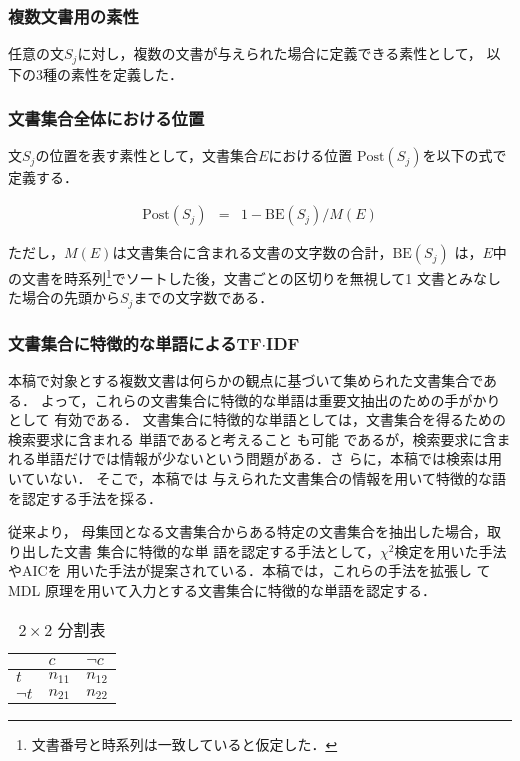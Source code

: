 \subsubsection{複数文書用の素性}

任意の文$S_j$に対し，複数の文書が与えられた場合に定義できる素性として，
以下の3種の素性を定義した．

\subsubsection*{文書集合全体における位置}

文$S_j$の位置を表す素性として，文書集合$E$における位置
$\mbox{Post}(S_j)$を以下の式で定義する．

\begin{eqnarray}
 \mbox{Post}(S_j) &=& 1 - \mbox{BE}(S_j)/M(E) \nonumber
\end{eqnarray}

ただし，$M(E)$は文書集合に含まれる文書の文字数の合計，$\mbox{BE}(S_j)$
は，$E$中の文書を時系列\footnote{
文書番号と時系列は一致していると仮定した．
}でソートした後，文書ごとの区切りを無視して1
文書とみなした場合の先頭から$S_j$までの文字数である．


\subsubsection*{文書集合に特徴的な単語によるTF$\cdot$IDF}

本稿で対象とする複数文書は何らかの観点に基づいて集められた文書集合である．
よって，これらの文書集合に特徴的な単語は重要文抽出のための手がかりとして
有効である．
文書集合に特徴的な単語としては，文書集合を得るための検索要求に含まれる
単語であると考えること
も可能
であるが，検索要求に含まれる単語だけでは情報が少ないという問題がある．さ
らに，本稿では検索は用いていない．
そこで，本稿では
与えられた文書集合の情報を用いて特徴的な語を認定する手法を採る．

従来より，
母集団となる文書集合からある特定の文書集合を抽出した場合，取り出した文書
集合に特徴的な単
語を認定する手法として，$\chi^2$検定を用いた手法\cite{article43,article45}やAICを
用いた手法\cite{article44}が提案されている．本稿では，これらの手法を拡張し
て MDL 原理を用いて入力とする文書集合に特徴的な単語を認定する．

\begin{table}[t]
 \begin{center}
  \caption{$2 \times 2$ 分割表}
  \label{tab01}
  \begin{tabular}{l|l|l}
   \hline
   \hline
   & $c$  & $\neg c$ \\
   \hline
   $t$ &$n_{11}$ & $n_{12}$\\
   $\neg t$ & $n_{21}$& $n_{22}$\\
   \hline
  \end{tabular}
 \end{center}
\end{table}


